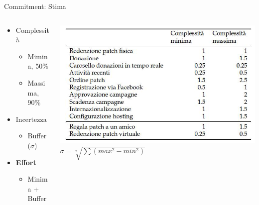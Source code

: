	\begin{frame}{Commitment: Stima}
		
		\begin{columns}[T]
		    \begin{column}{.5\textwidth}
		
				\begin{itemize}
					\item Complessità
					\begin{itemize}
						\item Mimina, 50\%
						\item Massima, 90\%
					\end{itemize}
					\item Incertezza
					\begin{itemize}
						\item Buffer ($ \sigma $)
					\end{itemize}
				\end{itemize}

				\begin{itemize}
					\item \textbf{Effort}
					\begin{itemize}
						\item Minima + Buffer
					\end{itemize}
				\end{itemize}
		
		    \end{column}
		    \begin{column}{.5\textwidth}
				\hspace*{-0.8cm} \includegraphics[scale=0.28]{images/effort}
				\\ \vspace*{0.2cm}
				{\small $ \sigma = \sqrt[2] { \sum \left ( max^{2} - min^{2} \right ) } $}
		    \end{column}
		 \end{columns}
	
	\end{frame}

